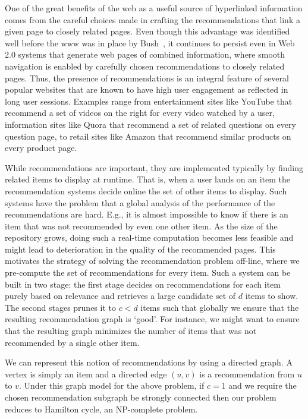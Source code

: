 One of the great benefits of the web as a useful source of hyperlinked
information comes from the careful choices made in crafting the recommendations
that link a given page to closely related pages. Even though this advantage was
identified well before the www was in place by Bush~\cite{Bush45}, it continues
to persist even in Web 2.0 systems that generate web pages of combined
information, where smooth navigation is enabled by carefully chosen
recommendations to closely related pages. Thus, the presence of recommendations
is an integral feature of several popular websites that are known to have high
user engagement as reflected in long user sessions. Examples range from 
entertainment sites like YouTube that recommend a set of videos on the right
for every video watched by a user, information sites like Quora that recommend
a set of related questions on every question page, to retail sites like Amazon
that recommend similar products on every product page. \vs


While recommendations are important, they are implemented typically by finding
related items to display at runtime. That is, when a user lands on an item the
recommendation systems decide online the set of other items to display. Such
systems have the problem that a global analysis of the performance of the
recommendations are hard. E.g., it is almost impossible to know if there is an
item that was not recommended by even one other item. As the size of the
repository grows, doing such a real-time computation becomes less feasible and
might lead to deterioration in the quality of the recommended pages.  This
motivates the strategy of solving the recommendation problem off-line, where we
pre-compute the set of recommendations for every item. Such a system can be
built in two stage: the first stage decides on recommendations for each item
purely based on relevance and retrieves a large candidate set of $d$ items to
show. The second stages prunes it to $c < d$ items such that globally we ensure
that the resulting recommendation graph is `good'. For instance, we might want
to ensure that the resulting graph minimizes the number of items that was not
recommended by a single other item. \vs

We can represent this notion of recommendations by using a directed graph. A
vertex is simply an item and a directed edge $(u, v)$ is a recommendation from
$u$ to $v$. Under this graph model for the above problem, if $c=1$ and we
require the chosen recommendation subgraph be strongly connected then our
problem reduces to Hamilton cycle, an NP-complete problem. \vs

